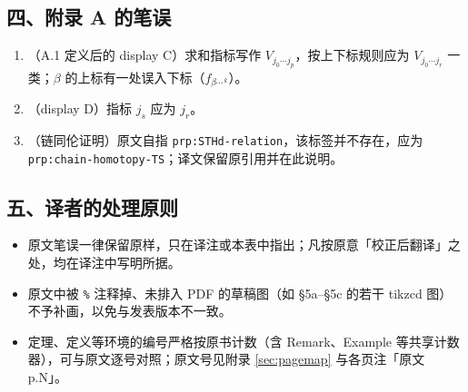 \subsection*{四、附录 A 的笔误}
\begin{enumerate}[leftmargin=1.6em,itemsep=2pt]
\item （A.1 定义后的 display C）求和指标写作 $V_{j_0\cdots j_p}$，按上下标规则应为 $V_{j_0\cdots j_r}$ 一类；$\beta$ 的上标有一处误入下标（$f_{\beta\cdots^{\,k}}$）。
\item （display D）指标 $j_s$ 应为 $j_r$。
\item （链同伦证明）原文自指 \texttt{prp:STHd-relation}，该标签并不存在，应为 \texttt{prp:chain-homotopy-TS}；译文保留原引用并在此说明。
\end{enumerate}

\subsection*{五、译者的处理原则}
\begin{itemize}[leftmargin=1.6em,itemsep=2pt]
\item 原文笔误一律保留原样，只在译注或本表中指出；凡按原意「校正后翻译」之处，均在译注中写明所据。
\item 原文中被 \texttt{\%} 注释掉、未排入 PDF 的草稿图（如 §5a--§5c 的若干 tikzcd 图）不予补画，以免与发表版本不一致。
\item 定理、定义等环境的编号严格按原书计数（含 Remark、Example 等共享计数器），可与原文逐号对照；原文号见附录 \ref{sec:pagemap} 与各页注「原文 p.N」。
\end{itemize}
